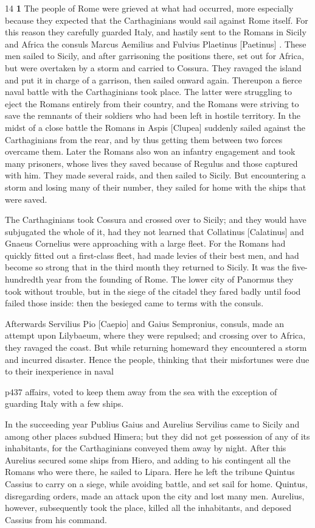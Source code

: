 14
\textbf{1} The people of Rome were grieved at what had occurred, more especially because they expected that the Carthaginians would sail against Rome itself. For this reason they carefully guarded Italy, and hastily sent to the Romans in Sicily and Africa the consuls Marcus Aemilius and Fulvius Plaetinus [Paetinus] . These men sailed to Sicily, and after garrisoning the positions there, set out for Africa, but were overtaken by a storm and carried to Cossura. They ravaged the island and put it in charge of a garrison, then sailed onward again. Thereupon a fierce naval battle with the Carthaginians took place. The latter were struggling to eject the Romans entirely from their country, and the Romans were striving to save the remnants of their soldiers who had been left in hostile territory. In the midst of a close battle the Romans in Aspis [Clupea] suddenly sailed against the Carthaginians from the rear, and by thus getting them between two forces overcame them. Later the Romans also won an infantry engagement and took many prisoners, whose lives they saved because of Regulus and those captured with him. They made several raids, and then sailed to Sicily. But encountering a storm and losing many of their number, they sailed for home with the ships that were saved.

The Carthaginians took Cossura and crossed over to Sicily; and they would have subjugated the whole of it, had they not learned that Collatinus [Calatinus] and Gnaeus Cornelius were approaching with a large fleet. For the Romans had quickly fitted out a first-class fleet, had made levies of their best men, and had become so strong that in the third month they returned to Sicily. It was the five-hundredth year from the founding of Rome. The lower city of Panormus they took without trouble, but in the siege of the citadel they fared badly until food failed those inside: then the besieged came to terms with the consuls.

Afterwards Servilius Pio [Caepio] and Gaius Sempronius, consuls, made an attempt upon Lilybaeum, where they were repulsed; and crossing over to Africa, they ravaged the coast. But while returning homeward they encountered a storm and incurred disaster. Hence the people, thinking that their misfortunes were due to their inexperience in naval

p437 affairs, voted to keep them away from the sea with the exception of guarding Italy with a few ships.

In the succeeding year Publius Gaius and Aurelius Servilius\texthebrew{⁠} came to Sicily and among other places subdued Himera; but they did not get possession of any of its inhabitants, for the Carthaginians conveyed them away by night. After this Aurelius secured some ships from Hiero, and adding to his contingent all the Romans who were there, he sailed to Lipara. Here he left the tribune Quintus Cassius to carry on a siege, while avoiding battle, and set sail for home. Quintus, disregarding orders, made an attack upon the city and lost many men. Aurelius, however, subsequently took the place, killed all the inhabitants, and deposed Cassius from his command.

